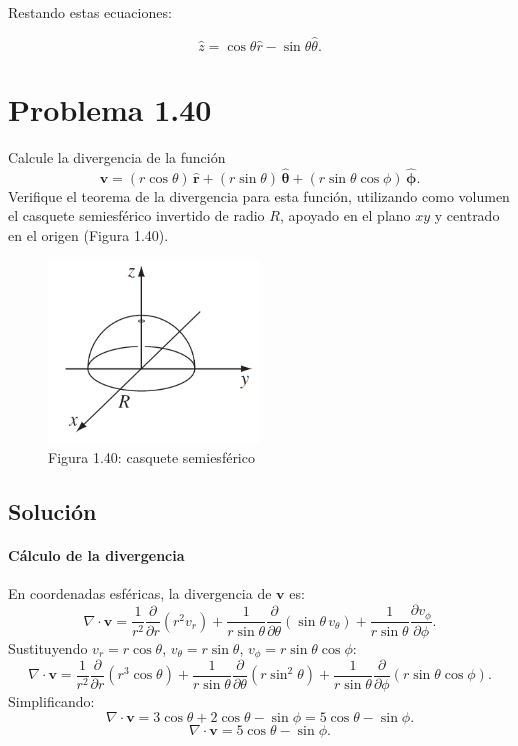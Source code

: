 \documentclass[12pt]{article}
\begin{document}
Restando estas ecuaciones:

\[
\boxed{\hat{z} = \cos\theta \hat{r} - \sin\theta \hat{\theta}.}
\]


\section*{\color{blue} Problema 1.40}
Calcule la divergencia de la función  
\[
\mathbf{v} = (r\cos\theta)\,\hat{\mathbf{r}} + (r\sin\theta)\,\hat{\boldsymbol{\theta}} + (r\sin\theta\cos\phi)\,\hat{\boldsymbol{\phi}}.
\]  
Verifique el teorema de la divergencia para esta función, utilizando como volumen el casquete semiesférico invertido de radio \(R\), apoyado en el plano \(xy\) y centrado en el origen (Figura 1.40).
\begin{figure}[ht]
    \centering
    \includegraphics[width=0.5\textwidth]{imagenes/punto_40.png}
    \captionsetup{labelformat=empty}
    \caption{Figura 1.40: casquete semiesférico}
\end{figure}

\subsection*{Solución}
\paragraph*{Cálculo de la divergencia}  
En coordenadas esféricas, la divergencia de \(\mathbf{v}\) es:  
\[
\nabla \cdot \mathbf{v} = \frac{1}{r^2} \frac{\partial}{\partial r} \left( r^2 v_r \right) + \frac{1}{r\sin\theta} \frac{\partial}{\partial \theta} \left( \sin\theta \, v_\theta \right) + \frac{1}{r\sin\theta} \frac{\partial v_\phi}{\partial \phi}.
\]  
Sustituyendo \(v_r = r\cos\theta\), \(v_\theta = r\sin\theta\), \(v_\phi = r\sin\theta\cos\phi\):  
\[
\nabla \cdot \mathbf{v} = \frac{1}{r^2} \frac{\partial}{\partial r} \left( r^3 \cos\theta \right) + \frac{1}{r\sin\theta} \frac{\partial}{\partial \theta} \left( r\sin^2\theta \right) + \frac{1}{r\sin\theta} \frac{\partial}{\partial \phi} \left( r\sin\theta\cos\phi \right).
\]  
Simplificando:  
\[
\nabla \cdot \mathbf{v} = 3\cos\theta + 2\cos\theta - \sin\phi = 5\cos\theta - \sin\phi.
\]
\[
\nabla \cdot \mathbf{v} = 5\cos\theta - \sin\phi.
\]
\end{document}
